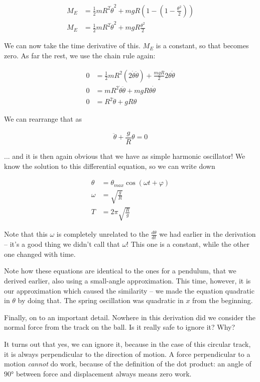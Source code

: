 \begin{align}
M_E &= \frac{1}{2} m R^2 \dot{\theta}^2 + m g R(1 - (1 - \frac{\theta^2}{2}))\\
M_E &= \frac{1}{2} m R^2 \dot{\theta}^2 + m g R \frac{\theta^2}{2}
\end{align}

We can now take the time derivative of this. $M_E$ is a constant, so that becomes zero. As far the rest, we use the chain rule again:

\begin{align}
0 &= \frac{1}{2} m R^2 (2 \dot{\theta} \ddot{\theta}) + \frac{m g R}{2} 2 \theta \dot{\theta}\\
0 &= m R^2 \dot{\theta} \ddot{\theta} + m g R \theta \dot{\theta}\\
0 &= R^2 \ddot{\theta} + g R \theta
\end{align}

We can rearrange that as

\begin{equation}
\ddot{\theta} + \frac{g}{R} \theta = 0
\end{equation}

... and it is then again obvious that we have as simple harmonic oscillator! We know the solution to this differential equation, so we can write down

\begin{align}
\theta &= \theta_{max} \cos (\omega t + \varphi)\\
\omega &= \sqrt{\frac{g}{R}}\\
T      &= 2 \pi \sqrt{\frac{R}{g}}
\end{align}

Note that this $\omega$ is completely unrelated to the $\displaystyle \frac{d\theta}{dt}$ we had earlier in the derivation -- it's a good thing we didn't call that $\omega$! This one is a constant, while the other one changed with time.

Note how these equations are identical to the ones for a pendulum, that we derived earlier, also using a small-angle approximation. This time, however, it is our approximation which caused the similarity -- we made the equation quadratic in $\theta$ by doing that. The spring oscillation was quadratic in $x$ from the beginning.

Finally, on to an important detail. Nowhere in this derivation did we consider the normal force from the track on the ball. Is it really safe to ignore it? Why?

It turns out that yes, we can ignore it, because in the case of this circular track, it is always perpendicular to the direction of motion. A force perpendicular to a motion \emph{cannot} do work, because of the definition of the dot product: an angle of $\ang{90}$ between force and displacement always means zero work.


